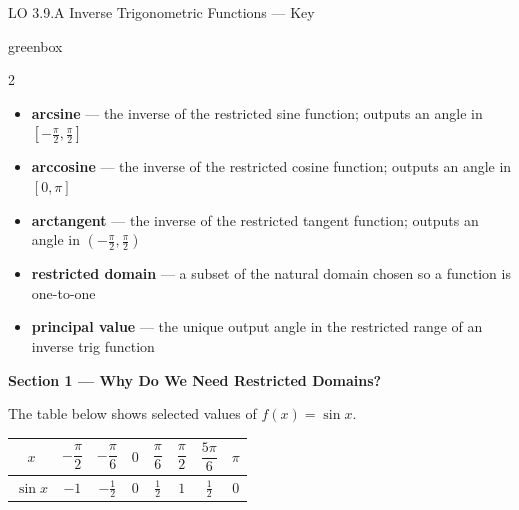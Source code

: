 \documentclass[10pt]{article}
\begin{document}

\vspace{0.10in}

\begin{notesbox}{LO 3.9.A \; Inverse Trigonometric Functions --- Key}

\begin{skillbox}{greenbox}
\begin{multicols}{2}
\begin{itemize}[leftmargin=1.4em, itemsep=1pt]
    \item \textbf{arcsine} --- the inverse of the restricted sine function;
          outputs an angle in $[-\tfrac{\pi}{2},\tfrac{\pi}{2}]$
    \item \textbf{arccosine} --- the inverse of the restricted cosine function;
          outputs an angle in $[0,\pi]$
    \item \textbf{arctangent} --- the inverse of the restricted tangent function;
          outputs an angle in $(-\tfrac{\pi}{2},\tfrac{\pi}{2})$
    \item \textbf{restricted domain} --- a subset of the natural domain chosen
          so a function is one-to-one
    \item \textbf{principal value} --- the unique output angle in the restricted
          range of an inverse trig function
\end{itemize}
\end{multicols}
\end{skillbox}

\vspace{0.08in}

\textbf{Section 1 --- Why Do We Need Restricted Domains?}

The table below shows selected values of $f(x) = \sin x$.

\begin{center}
\renewcommand{\arraystretch}{1.8}
\begin{tabular}{|c|c|c|c|c|c|c|c|}
\hline
$x$ &
$-\dfrac{\pi}{2}$ & $-\dfrac{\pi}{6}$ & $0$ &
$\dfrac{\pi}{6}$ & $\dfrac{\pi}{2}$ & $\dfrac{5\pi}{6}$ & $\pi$ \\
\hline
$\sin x$ & $-1$ & $-\tfrac{1}{2}$ & $0$ &
$\tfrac{1}{2}$ & $1$ & $\tfrac{1}{2}$ & $0$ \\
\hline
\end{tabular}
\end{center}


\end{notesbox}
\end{document}
